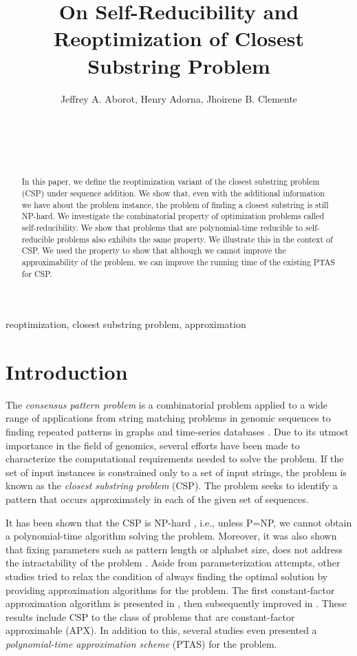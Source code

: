 \documentclass[journal]{acm_proc_article-sp}
\title{On Self-Reducibility and Reoptimization of Closest Substring Problem}
\author{ Jeffrey A. Aborot,   Henry Adorna,  Jhoirene B. Clemente		\\
\affaddr{Algorithms and Complexity Laboratory}\\
		\affaddr{Department of Computer Science}\\
		\affaddr{College of Engineering}\\
		\affaddr{University of the Philippines Diliman}\\
		\email{jeffrey.aborot@up.edu.ph, ha@dcs.upd.edu.ph, jbclemente@up.edu.ph}
}
\begin{document}
\maketitle

\pagestyle{empty}
\thispagestyle{empty}

\begin{abstract}
In this paper, we define  the  reoptimization variant of the closest substring problem (CSP) under sequence addition. We show that, even with the additional information we have about the problem instance, the problem of finding a closest substring is still NP-hard. We investigate the combinatorial property of optimization problems called self-reducibility. We show that problems that are polynomial-time reducible to  self-reducible problems also exhibits the same property. We illustrate this in the context of CSP. We used the property to show that although we cannot improve the approximability of the problem, we can improve the running time of the existing PTAS for CSP.

\end{abstract}

\begin{keywords}
reoptimization, closest substring problem, approximation
\end{keywords}



\section{Introduction}
The \textit{consensus pattern problem} is a combinatorial problem applied to a wide range of applications from string matching problems in genomic sequences \cite{Bodlaender1995} to finding repeated patterns in graphs \cite{Dondi2013} and time-series databases \cite{Li2010}. Due to its utmost importance in the field of genomics, several efforts have been made to characterize the computational requirements needed to solve the problem. If the set of input instances is constrained only to a set of input strings, the problem is known as the \textit{closest substring problem} (CSP). The problem seeks to identify a pattern that occurs approximately in each of the given set of sequences. 

It has been shown that the CSP is NP-hard \cite{Garey1979}, i.e., unless P=NP, we cannot obtain a polynomial-time algorithm solving the problem. Moreover, it was also shown that  fixing  parameters such as pattern length or alphabet size, does not address the intractability of the problem \cite{Evans2003}. Aside from parameterization attempts, other studies tried to relax the condition of always finding the optimal solution by providing approximation algorithms for the problem. The first constant-factor approximation algorithm is presented in \cite{Lanctot1998}, then subsequently improved in  \cite{Li1999}. These results include CSP to the class of problems that are constant-factor approximable (APX). In addition to this, several studies  \cite{Li1999,Ma2000,Ma2008} even presented a \textit{polynomial-time approximation scheme} (PTAS) for the problem.
\end{document}
